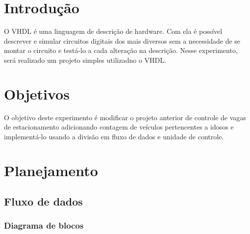 \documentclass[a4,12pt]{horizon-theme}
\begin{document}
\horizonCover

\horizonTitle


\section{Introdução} %
O VHDL é uma linguagem de descrição de hardware. Com ela é possível descrever e simular circuitos digitais dos mais diversos sem a necessidade de se montar o circuito e testá-lo a cada alteração na descrição. Nesse experimento, será realizado um projeto simples utilizadno o VHDL.

\section{Objetivos} %
O objetivo deste experimento é modificar o projeto anterior de controle de vagas de estacionamento adicionando contagem de veículos pertencentes a idosos e implementá-lo usando a divisão em fluxo de dados e unidade de controle.


\section{Planejamento} %
\label{sec:plan}

\subsection{Fluxo de dados}
\label{sec:fd}


\subsubsection{Diagrama de blocos}
\label{sec:fd_blocos}
\end{document}
